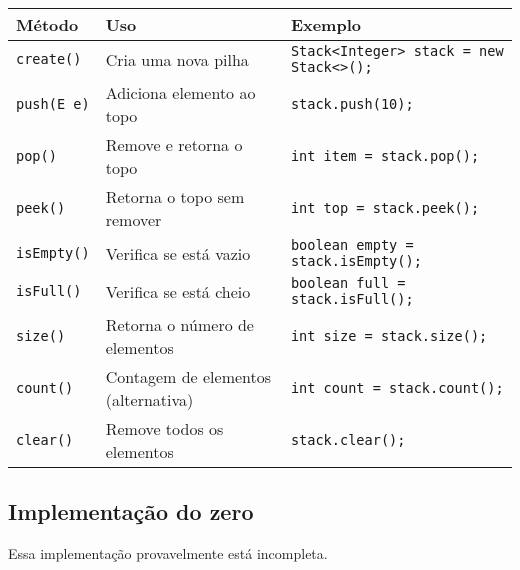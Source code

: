 \documentclass{article}
\begin{document}
\begin{table}[h!]
\centering
\begin{tabular}{|l|l|l|}
\hline
\textbf{Método} & \textbf{Uso} & \textbf{Exemplo} \\
\hline
\texttt{create()} & Cria uma nova pilha & \texttt{Stack<Integer> stack = new Stack<>();} \\
\texttt{push(E e)} & Adiciona elemento ao topo & \texttt{stack.push(10);} \\
\texttt{pop()} & Remove e retorna o topo & \texttt{int item = stack.pop();} \\
\texttt{peek()} & Retorna o topo sem remover & \texttt{int top = stack.peek();} \\
\texttt{isEmpty()} & Verifica se está vazio & \texttt{boolean empty = stack.isEmpty();} \\
\texttt{isFull()} & Verifica se está cheio & \texttt{boolean full = stack.isFull();} \\
\texttt{size()} & Retorna o número de elementos & \texttt{int size = stack.size();} \\
\texttt{count()} & Contagem de elementos (alternativa) & \texttt{int count = stack.count();} \\
\texttt{clear()} & Remove todos os elementos & \texttt{stack.clear();} \\
\hline
\end{tabular}
\label{tab:stack_methods}
\end{table}

\subsection{Implementação do zero}
Essa implementação provavelmente está incompleta.
\end{document}
